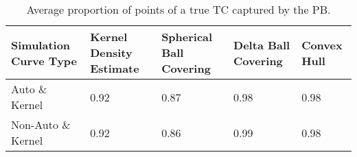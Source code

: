 \begin{table}[ht!]
\centering
\begin{tabular}{|R{1.2in}||L{.95in}L{.8in}|L{.75in}L{.75in}|}
  \hline
Simulation Curve Type & Kernel Density Estimate & Spherical Ball Covering & Delta Ball Covering & Convex Hull \\ 
  \hline
Auto \& Kernel & 0.92 & 0.87 & 0.98 & 0.98 \\ 
  Non-Auto \& Kernel & 0.92 & 0.86 & 0.99 & 0.98 \\ 
   \hline
\end{tabular}
\caption{Average proportion of points of a true TC captured by the PB.} 
\label{tab:average_captured}
\end{table}
